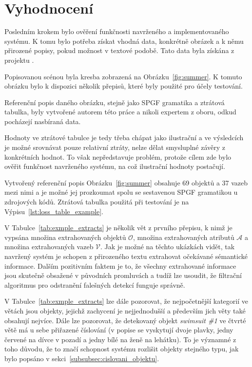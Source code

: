 \clearpage
\section{Vyhodnocení}\label{sec:vyhodnoceni}
Posledním krokem bylo ověření funkčnosti navrženého a implementovaného systému.
K tomu bylo potřeba získat vhodná data, konkrétně obrázek a k němu přirozené popisy, pokud možnost v textové podobě.
Tato data byla získána z projektu \projekt.

Popisovanou scénou byla kresba zobrazená na Obrázku~\ref{fig:summer}.
K tomuto obrázku bylo k dispozici několik přepisů, které byly použité pro účely testování.

Referenční popis daného obrázku, stejně jako SPGF gramatika a ztrátová tabulka,
byly vytvořené autorem této práce a nikoli expertem z oboru, odkud pocházejí nasbíraná data.

Hodnoty ve ztrátové tabulce je tedy třeba chápat jako ilustrační a ve výsledcích je možné srovnávat pouze relativní ztráty,
nelze dělat smysluplné závěry z konkrétních hodnot.
To však nepředstavuje problém, protože cílem zde bylo ověřit funkčnost navrženého systému, na což ilustrační hodnoty postačují.

Vytvořený referenční popis Obrázku~\ref{fig:summer} obsahuje 69 objektů a 37 vazeb mezi nimi a je možné jej prozkoumat spolu se sestavenou SPGF gramatikou u zdrojových kódů.
Ztrátová tabulka použitá při testování je na Výpisu~\ref{lst:loss_table_example}.

% 
V Tabulce~\ref{tab:exmple_extracts} je několik vět z prvního přepisu, k nimž je vypsána množina extrahovaných objektů $\mathcal{O}$,
množina extrahovaných atributů $\mathcal A$ a množina extrahovaných vazeb $\mathcal V$.
Jak je možné na těchto ukázkách vidět, tak navržený systém je schopen z přirozeného textu extrahovat očekávané sémantické informace.
Dalším pozitivním faktem je to, že všechny extrahované informace jsou skutečně obsažené v původních promluvách a tudíž lze usoudit, že filtrační
algoritmus pro odstranění falešných detekcí funguje správně.



V Tabulce~\ref{tab:exmple_extracts} lze dále pozorovat, že nejpočetnější kategorií ve větách jsou objekty, jejichž zachycení je nejjednodušší a především jich věty také obsahují nejvíce.
Dále lze pozorovat, že detekovaný objekt \emph{swimsuit \#1} ve čtvrté větě má u sebe přiřazené číslování (v popise se vyskytují dvoje plavky, jedny červené na dívce v pozadí
a jedny bílé na ženě na lehátku).
To je významné z toho důvodu, že to značí schopnost systému rozlišit objekty stejného typu, jak bylo popsáno v sekci~\ref{subsubsec:cislovani_objektu}.

